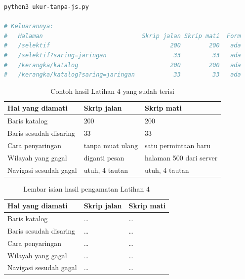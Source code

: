\begin{lstlisting}[language=bash, caption={Memeriksa isi yang tetap tampil tanpa skrip, tersedia di \berkas{sources/chapter11/ukur-tanpa-js.py}}, label={lst:c11-lat4-jalan}]
python3 ukur-tanpa-js.py

# Keluarannya:
#   Halaman                            Skrip jalan Skrip mati  Form
#   /selektif                                  200        200   ada
#   /selektif?saring=jaringan                   33         33   ada
#   /kerangka/katalog                          200        200   ada
#   /kerangka/katalog?saring=jaringan           33         33   ada
\end{lstlisting}

\begin{table}[!htb]
  \centering
  \caption{Contoh hasil Latihan 4 yang sudah terisi}
  \label{tab:c11-lat4-contoh}
  \begin{tabularx}{\textwidth}{Xll}
    \hline
    \textbf{Hal yang diamati} & \textbf{Skrip jalan} & \textbf{Skrip mati} \\
    \hline
    Baris katalog & 200 & 200 \\
    \hline
    Baris sesudah disaring & 33 & 33 \\
    \hline
    Cara penyaringan & tanpa muat ulang & satu permintaan baru \\
    \hline
    Wilayah yang gagal & diganti pesan & halaman 500 dari server \\
    \hline
    Navigasi sesudah gagal & utuh, 4 tautan & utuh, 4 tautan \\
    \hline
  \end{tabularx}
\end{table}

\begin{table}[!htb]
  \centering
  \caption{Lembar isian hasil pengamatan Latihan 4}
  \label{tab:c11-lat4-hasil}
  \begin{tabularx}{\textwidth}{Xll}
    \hline
    \textbf{Hal yang diamati} & \textbf{Skrip jalan} & \textbf{Skrip mati} \\
    \hline
    Baris katalog & \dots & \dots \\
    \hline
    Baris sesudah disaring & \dots & \dots \\
    \hline
    Cara penyaringan & \dots & \dots \\
    \hline
    Wilayah yang gagal & \dots & \dots \\
    \hline
    Navigasi sesudah gagal & \dots & \dots \\
    \hline
  \end{tabularx}
\end{table}

